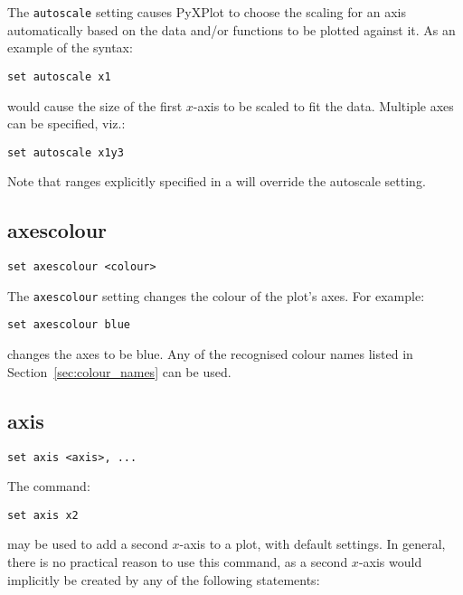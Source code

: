 The {\tt autoscale} setting causes PyXPlot to choose the scaling for an axis
automatically based on the data and/or functions to be plotted against it. As
an example of the syntax:

\begin{verbatim}
set autoscale x1
\end{verbatim}

\noindent would cause the size of the first $x$-axis to be scaled to fit the
data.  Multiple axes can be specified, viz.:

\begin{verbatim}
set autoscale x1y3
\end{verbatim}

Note that ranges explicitly specified in a  will override
the autoscale setting.


\subsection{axescolour}

\begin{verbatim}
set axescolour <colour>
\end{verbatim}

The {\tt axescolour} setting changes the colour of the plot's axes.  For example:

\begin{verbatim}
set axescolour blue
\end{verbatim}

\noindent changes the axes to be blue. Any of the recognised colour names listed in
Section~\ref{sec:colour_names} can be used.
 

\subsection{axis}

\begin{verbatim}
set axis <axis>, ...
\end{verbatim}

The command:

\begin{verbatim}
set axis x2
\end{verbatim}

\noindent may be used to add a second $x$-axis to a plot, with default settings. In
general, there is no practical reason to use this command, as a second $x$-axis
would implicitly be created by any of the following statements:

